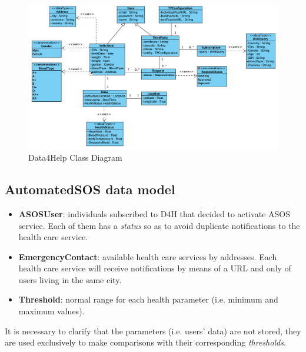 \documentclass[a4paper, hidelinks, 12pt]{report}
\begin{document}
	\begin{figure}[H]
    		\centering
		\includegraphics[width=1\textwidth]{diagrams/d4h_class_diagram.png}
		\caption[Data4Help Class Diagram]{Data4Help Class Diagram}
		\label{fig:Data4Help Class Diagram}
	\end{figure}
	
	\subsection{AutomatedSOS data model}
	\begin{itemize}
		\item{\textbf{ASOSUser}}: individuals subscribed to D4H that decided to activate ASOS service. Each of them has a \textit{status} so as to avoid duplicate notifications to the health care service. 
		\item{\textbf{EmergencyContact}}: available health care services by addresses.  Each health care service will receive notifications by means of a URL and only of users living in the same city.
		\item {\textbf{Threshold}}: normal range for each health parameter (i.e. minimum and maximum values).
	\end{itemize}
	
	It is necessary to clarify that the parameters (i.e. users' data) are not stored, they are used exclusively to make comparisons with their corresponding  \textit{thresholds}. \\
	
\end{document}
